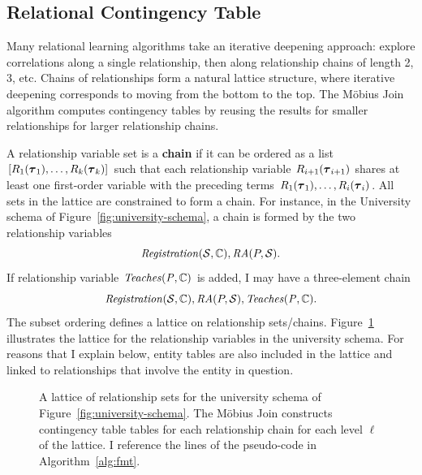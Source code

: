 \documentclass{sfuthesis}
\begin{document}
\subsection{Relational  Contingency Table}
Many relational learning algorithms take an iterative deepening approach: explore correlations along a single relationship, then along relationship chains of length 2, 3, etc. Chains of relationships form a natural lattice structure, where iterative deepening corresponds to moving from the bottom to the top.  The M\"obius Join algorithm computes contingency tables by reusing the results for smaller relationships for larger relationship chains. 

A relationship variable set is a \textbf{chain} if it can be ordered as a list $[R_{1}(\boldsymbol{\tau}_{1}),\ldots,R_{k}(\boldsymbol{\tau}_{k})]$ 
such that each relationship variable $R_{i+1}(\boldsymbol{\tau}_{i+1})$ shares at least one first-order variable with the preceding terms $R_{1}(\boldsymbol{\tau}_{1}),\ldots,R_{i}(\boldsymbol{\tau}_{i})$.
All sets in the lattice are constrained to form a chain. For instance, in the University schema of Figure~\ref{fig:university-schema}, a chain is formed by the two relationship variables
\[\mathit{Registration}(\mathcal{S},\mathbb{C}),\mathit{RA}(P,\mathcal{S}).\] If relationship variable $\it{Teaches}(P,\mathbb{C})$ is added, I  may have a three-element chain \[\mathit{Registration}(\mathcal{S},\mathbb{C}),\mathit{RA}(P,\mathcal{S}),\it{Teaches}(P,\mathbb{C}).\] 
The subset ordering defines a lattice on relationship sets/chains.  Figure~\ref{fig:big-lattice} illustrates the  lattice for the relationship variables in the university schema.  For reasons that I  explain below, entity tables are also included in the lattice and linked to relationships that involve the entity in question. 

\begin{figure}[!h]
\begin{center}
\caption{A lattice of relationship sets for the university schema of Figure~\ref{fig:university-schema}. The M\"obius Join constructs contingency table tables for each relationship chain for each level $\ell$ of the lattice. I  reference the lines of the pseudo-code in Algorithm~\ref{alg:fmt}.
\label{fig:big-lattice}}
\end{center}
\end{figure}
\end{document}
